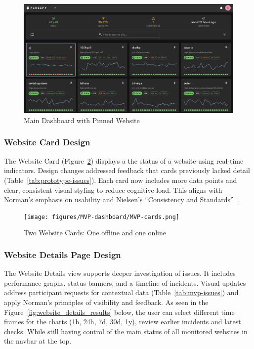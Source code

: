 \begin{figure}[H]
    \centering
    \includegraphics[width=1\linewidth]{figures/main_dashboard.png}
    \caption{Main Dashboard with Pinned Website}
    \label{fig:main_dashboard}
\end{figure}

\subsubsection{Website Card Design}
The Website Card (Figure~\ref{fig:websitecard_comparison}) displays a the status of a website using real-time indicators. Design changes addressed feedback that cards previously lacked detail (Table~\ref{tab:prototype-issues}). Each card now includes more data points and clear, consistent visual styling to reduce cognitive load. This aligns with Norman’s emphasis on usability and Nielsen’s “Consistency and Standards”~\autocite{Nielsen1994}.

\begin{figure}[H]
    \centering
    \texttt{[image: figures/MVP-dashboard/MVP-cards.png]}
    \caption{Two Website Cards: One offline and one online}
    \label{fig:websitecard_comparison}
\end{figure}

\subsubsection{Website Details Page Design}
The Website Details view supports deeper investigation of issues. It includes performance graphs, status banners, and a timeline of incidents. Visual updates address participant requests for contextual data (Table~\ref{tab:mvp-issues}) and apply Norman’s principles of visibility and feedback. As seen in the Figure~\ref{fig:website_details_results} below, the user can select different time frames for the charts (1h, 24h, 7d, 30d, 1y), review earlier incidents and latest checks. While still having control of the main status of all monitored websites in the navbar at the top.

